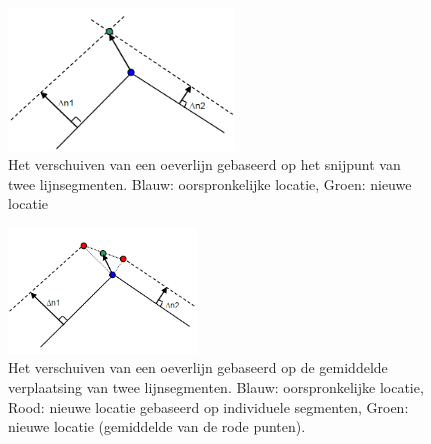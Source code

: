 \begin{figure}
\includegraphics[width=6cm]{figures/Fig4-3.png}
\caption{Het verschuiven van een oeverlijn gebaseerd op het snijpunt van twee lijnsegmenten.
Blauw: oorspronkelijke locatie, Groen: nieuwe locatie}
\label{Fig4.3}
\end{figure}

\begin{figure}
\includegraphics[width=5cm]{figures/Fig4-4.png}
\caption{Het verschuiven van een oeverlijn gebaseerd op de gemiddelde verplaatsing van twee lijnsegmenten.
Blauw: oorspronkelijke locatie, Rood: nieuwe locatie gebaseerd op individuele segmenten, Groen: nieuwe locatie (gemiddelde van de rode punten).}
\label{Fig4.4}
\end{figure}